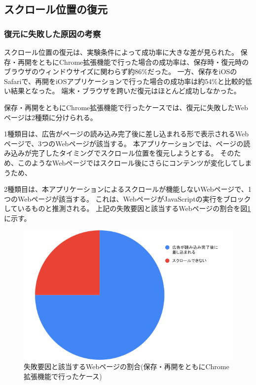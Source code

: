 \subsection{スクロール位置の復元}

\subsubsection{復元に失敗した原因の考察}
スクロール位置の復元は、実験条件によって成功率に大きな差が見られた。
保存・再開をともにChrome拡張機能で行った場合の成功率は、保存時・復元時のブラウザのウィンドウサイズに関わらず約86\%だった。
一方、保存をiOSのSafariで、再開をiOSアプリケーションで行った場合の成功率は約54\%と比較的低い結果となった。
端末・ブラウザを跨いだ復元はほとんど成功しなかった。

保存・再開をともにChrome拡張機能で行ったケースでは、復元に失敗したWebページは2種類に分けられる。

1種類目は、広告がページの読み込み完了後に差し込まれる形で表示されるWebページで、3つのWebページが該当する。
本アプリケーションでは、ページの読み込みが完了したタイミングでスクロール位置を復元しようとする。
そのため、このようなWebページではスクロール後にさらにコンテンツが変化してしまうため、

2種類目は、本アプリケーションによるスクロールが機能しないWebページで、1つのWebページが該当する。
これは、WebページがJavaScriptの実行をブロックしているものと推測される。
上記の失敗要因と該当するWebページの割合を図\ref{fig:evl-consideration-scroll-position-cause-ratio-chrome}に示す。

\begin{figure}[htbp]
  \caption{失敗要因と該当するWebページの割合(保存・再開をともにChrome拡張機能で行ったケース)}
  \label{fig:evl-consideration-scroll-position-cause-ratio-chrome}
  \begin{center}
    \includegraphics[bb=0 0 600 371,width=15cm]{img/060_evaluation/consideration/scroll_position/cause-ratio-chrome.pdf}
  \end{center}
\end{figure}

